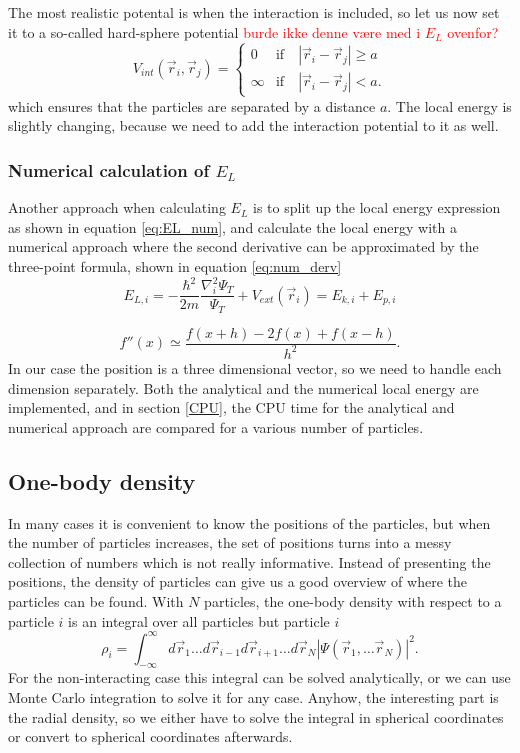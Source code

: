 \documentclass[norsk,a4paper,12pt]{article}
\begin{document}
The most realistic potental is when the interaction is included, so let us now set it to a so-called hard-sphere potential \textcolor{red}{burde ikke denne være med i $E_L$ ovenfor?}
\begin{equation}
V_{int}(\vec{r}_i, \vec{r}_j)=
\begin{cases} 
   0 & \text{if}\quad |\vec{r}_i-\vec{r}_j| \geq a \\
   \infty & \text{if}\quad |\vec{r}_i-\vec{r}_j| < a.
\end{cases}
\end{equation}
which ensures that the particles are separated by a distance $a$. The local energy is slightly changing, because we need to add the interaction potential to it as well. 

\subsubsection{Numerical calculation of $E_L$}

Another approach when calculating $E_L$ is to split up the local energy expression as shown in equation \ref{eq:EL_num}, and calculate the local energy with a numerical approach where the second derivative can be approximated by the three-point formula, shown in equation \ref{eq:num_derv}
\begin{equation}
\label{eq:EL_num}
E_{L,i}=-\frac{\hbar^2}{2m}\frac{\nabla_i^2\Psi_T}{\Psi_T}+V_{ext}(\vec{r}_i)=E_{k,i}+E_{p,i}
\end{equation}

\begin{equation}
\label{eq:num_derv}
f''(x)\simeq\frac{f(x+h)-2f(x)+f(x-h)}{h^2}.
\end{equation}
In our case the position is a three dimensional vector, so we need to handle each dimension separately. Both the analytical and the numerical local energy are implemented, and in section \ref{CPU}, the CPU time for the analytical and numerical approach are compared for a various number of particles. 


\subsection{One-body density} \label{sec:OB_theory}
In many cases it is convenient to know the positions of the particles, but when the number of particles increases, the set of positions turns into a messy collection of numbers which is not really informative. Instead of presenting the positions, the density of particles can give us a good overview of where the particles can be found. With $N$ particles, the one-body density with respect to a particle $i$ is an integral over all particles but particle $i$
\begin{equation}
\rho_i=\int_{-\infty}^{\infty}d\vec{r}_1\hdots d\vec{r}_{i-1}d\vec{r}_{i+1}\hdots d\vec{r}_N |\Psi(\vec{r}_1,\hdots \vec{r}_N)|^2.
\end{equation}
For the non-interacting case this integral can be solved analytically, or we can use Monte Carlo integration to solve it for any case. Anyhow, the interesting part is the radial density, so we either have to solve the integral in spherical coordinates or convert to spherical coordinates afterwards. 
\end{document}
